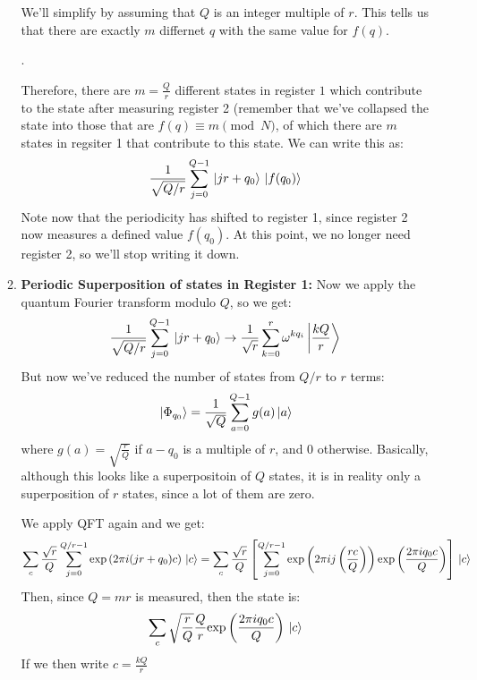 \begin{itemize}
\begin{enumerate}[label=\arabic*.]
				We'll simplify by assuming that \( Q \) is an integer multiple of \( r \). This tells us that there are 
				exactly \( m \)  differnet \( q \) with the same value for \( f(q) \).  

				. 

				Therefore, there are \( m = \frac{Q}{r} \) different states in register \( 1 \) which contribute 
				to the state after measuring register 2 (remember that we've collapsed the state into those 
				that are \( f(q) \equiv m \pmod N \), of which there are \( m \) states in regsiter 1 
				that contribute to this state. We can write this as:
				\[
				\frac{1}{\sqrt{Q / r} }\sum_{j = 0}^{Q - 1}\ket*{jr + q_0}\ket*{f(q_0)}
				\] 
				Note now that the periodicity has shifted to register 1, since register 2 now measures a defined 
				value \( f(q_0) \). At this point, we no longer need register 2, so we'll stop writing it down.  
			\item \textbf{Periodic Superposition of states in Register 1:} Now we apply the quantum Fourier 
				transform modulo \( Q \), so we get: 
				\[
				\frac{1}{\sqrt{Q / r} }\sum_{j = 0}^{Q - 1}\ket*{jr + q_0} \to \frac{1}{\sqrt{r} }\sum_{k = 0}^{r}
				\omega^{kq_i}\ket{\frac{kQ}{r}}
				\] 
				But now we've reduced the number of states from \( Q / r \) to \( r \) terms:
				\[
				\ket*{\Phi_{q_0}} = \frac{1}{\sqrt{Q} }\sum_{a = 0}^{Q - 1}g(a) \ket*{a}
				\] 
				where \( g(a) = \sqrt{\frac{r}{Q}}  \) if \( a - q_0 \) is a multiple of \( r \), and 0 otherwise. 
				Basically, although this looks like a superpositoin of \( Q \) states, it is in reality only 
				a superposition of \( r \) states, since a lot of them are zero. 

				We apply QFT again and we get: 
				\[
					\sum_{c}\frac{\sqrt{r} }{Q}\sum_{j = 0}^{Q / r - 1 }\mathrm{exp}\left( 2 \pi i (jr + q_0)c \right) \ket*{c} 
					= \sum_c \frac{\sqrt{r} }{Q} \left[ \sum_{j = 0}^{Q / r - 1}\mathrm{exp}\left( 2 \pi i j \left( \frac{rc}{Q} \right) \right) \mathrm{exp}\left( \frac{2 \pi i q_0c}{Q} \right) \right] \ket*{c}
				\] 
				Then, since \( Q = mr \) is measured, then the state is: 
				\[
					\sum_{c}\sqrt{\frac{r}{Q}} \frac{Q}{r}\mathrm{exp}\left( \frac{2 \pi i q_0c}{Q} \right) \ket*{c}
				\] 
				If we then write \( c = \frac{kQ}{r} \)
		\end{enumerate}
\end{itemize}
